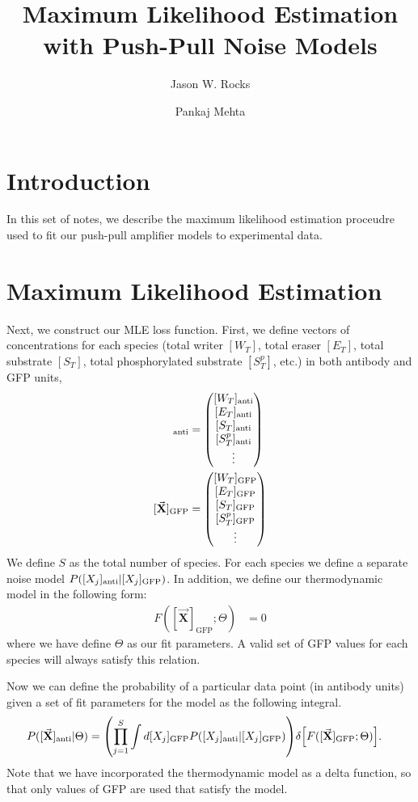 \documentclass[aps,onecolumn,superscriptaddress,notitlepage]{revtex4-1}
\newcommand{\vbX}{\vec{\mathbf{X}}}
\begin{document}
\title{Maximum Likelihood Estimation with Push-Pull Noise Models}
\author{Jason W. Rocks}
\author{Pankaj Mehta}
\maketitle

\section{Introduction}
In this set of notes, we describe the maximum likelihood estimation proceudre used to fit our push-pull amplifier models to experimental data.



\section{Maximum Likelihood Estimation}
Next, we construct our MLE loss function.
First, we define vectors of concentrations for each species (total writer $[W_T]$, total eraser $[E_T]$, total substrate $[S_T]$, total phosphorylated substrate $[S_T^p]$, etc.) in both antibody and GFP units,
\begin{align}
[\vbX]_{\mathrm{anti}} &= \mqty([W_T]_{\mathrm{anti}}\\
[E_T]_{\mathrm{anti}}\\
[S_T]_{\mathrm{anti}}\\
[S^p_T]_{\mathrm{anti}}\\
\vdots)\\
[\vbX]_{\mathrm{GFP}} &= \mqty([W_T]_{\mathrm{GFP}}\\
[E_T]_{\mathrm{GFP}}\\
[S_T]_{\mathrm{GFP}}\\
[S^p_T]_{\mathrm{GFP}}\\
\vdots)
\end{align}
We define $S$ as the total number of species.
For each species we define a separate noise model $P\qty( [X_j]_{\mathrm{anti}} | [X_j]_{\mathrm{GFP}})$.
In addition, we define our thermodynamic model in the following form:
\begin{align}
F([\vbX]_{\mathrm{GFP}};\Theta) &= 0
\end{align} 
where we have define $\Theta$ as our fit parameters.
A valid set of GFP values for each species will always satisfy this relation.

Now we can define the probability of a particular data point (in antibody units) given a set of fit parameters for the model as the following integral.
\begin{align}
P([\vbX]_{\mathrm{anti}} | \Theta ) &= \qty(\prod_{j=1}^S \int d[X_j]_{\mathrm{GFP}} P\qty([X_j]_{\mathrm{anti}} |  [X_j]_{\mathrm{GFP}}))\delta\qty[F([\vbX]_{\mathrm{GFP}};\Theta)].
\end{align}
Note that we have incorporated the thermodynamic model as a delta function, so that only values of GFP are used that satisfy the model.
\end{document}

